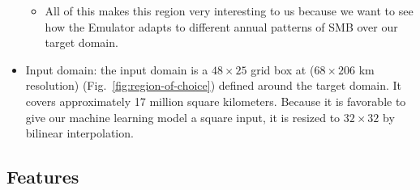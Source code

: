 \documentclass[a4paper,11pt,oneside]{report}
\begin{document}
\begin{itemize}
\begin{itemize}
        \item All of this makes this region very interesting to us because we want to see how the Emulator adapts to different annual patterns of SMB over our target domain.  
    \end{itemize}
    \item Input domain: the input domain is a $48\times25$ grid box at ($68 \times 206$ \si{km} resolution) (Fig.~\ref{fig:region-of-choice}) defined around the target domain. It covers approximately 17 million square kilometers. Because it is favorable to give our machine learning model a square input, it is resized to $32\times 32$ by bilinear interpolation. 
\end{itemize}


\subsection{Features}\label{subsec:features}
\end{document}
